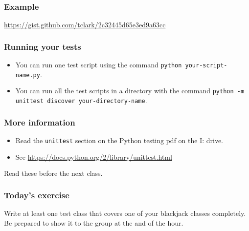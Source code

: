 \documentclass[10pt]{beamer}
\begin{document}
\begin{frame}
	\frametitle{Example}

	\url{https://gist.github.com/tclark/2c32445d65e3ed9a63cc}

\end{frame}

\begin{frame}
	\frametitle{Running your tests}

	\begin{itemize}
		\item You can run one test script using the command \texttt{python your-script-name.py}.
		\item You can run all the test scripts in a directory with the command \texttt{python -m 
			unittest discover your-directory-name}.
	\end{itemize}
\end{frame}

\begin{frame}
	\frametitle{More information}

	\begin{itemize}
		\item Read the \texttt{unittest} section on the Python testing pdf on the I: drive.
		\item See \url{https://docs.python.org/2/library/unittest.html}
	\end{itemize}

	Read these before the next class.
\end{frame}

\begin{frame}
	\frametitle{Today's exercise}

	Write at least one test class that covers one of your blackjack classes completely.  Be prepared 
	to show it to the group at the and of the hour.
\end{frame}
\end{document}
